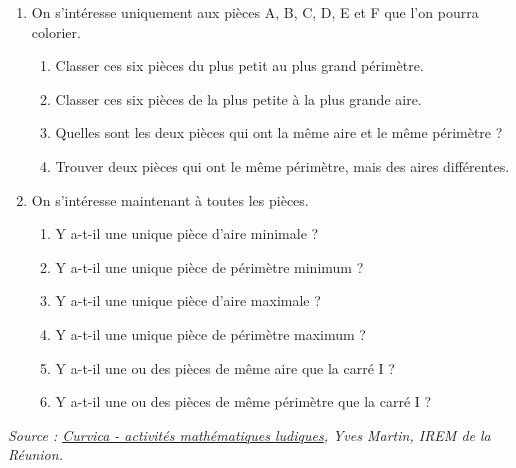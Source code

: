 \begin{changemargin}{-10mm}{-10mm}
\begin{activite}
       \begin{spacing}{1.5}
       \begin{enumerate}
          \item On s’intéresse uniquement aux pièces A, B, C, D, E et F que l'on pourra colorier.
             \begin{enumerate}
                \item Classer ces six pièces du plus petit au plus grand périmètre. \pointilles
                \item Classer ces six pièces de la plus petite à la plus grande aire. \pointilles
                \item Quelles sont les deux pièces qui ont la même aire et le même périmètre ? \pointilles
                \item Trouver deux pièces qui ont le même périmètre, mais des aires différentes. \pointilles 
             \end{enumerate}
          \item On s'intéresse maintenant à toutes les pièces.
             \begin{enumerate}
                \item Y a-t-il une unique pièce d’aire minimale ? \pointilles
                \item Y a-t-il une unique pièce de périmètre minimum ? \pointilles             
                \item Y a-t-il une unique pièce d’aire maximale ? \pointilles           
                \item Y a-t-il une unique pièce de périmètre maximum ? \pointilles         
                \item Y a-t-il une ou des pièces de même aire que la carré I ? \pointilles
                \item Y a-t-il une ou des pièces de même périmètre que la carré I ? \pointilles \\ [-15mm]
             \end{enumerate}
       \end{enumerate}
       \end{spacing}
 \end{activite}
 
 \vfill\hfill{\small\it Source : \href{https://irem.univ-reunion.fr/spip.php?article802}{Curvica - activités mathématiques ludiques}, Yves Martin, IREM de la Réunion.}
\end{changemargin}